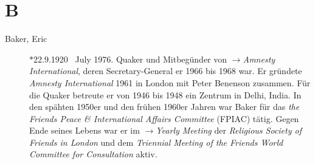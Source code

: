 \section*{B}

\articlesize

\begin{description}

 \item[Baker, Eric] $\ast$22.9.1920 \dag~July 1976. Quaker und Mitbegünder von
$\to$\textit{Amnesty International}, deren Secretary-General er 1966 bis 1968
war. Er gründete \textit{Amnesty International} 1961 in London mit Peter
Benenson zusammen. Für die Quaker betreute er von 1946 bis 1948 ein Zentrum in
Delhi, India. In den spähten 1950er und den frühen 1960er Jahren war Baker für
das \textit{the Friends Peace \& International Affairs Committee} (FPIAC) tätig.
Gegen Ende seines Lebens war er im $\to$\textit{Yearly Meeting} der
\textit{Religious Society of Friends in London} und dem \textit{Triennial
Meeting of the Friends World Committee for Consultation} aktiv.


\end{description}
